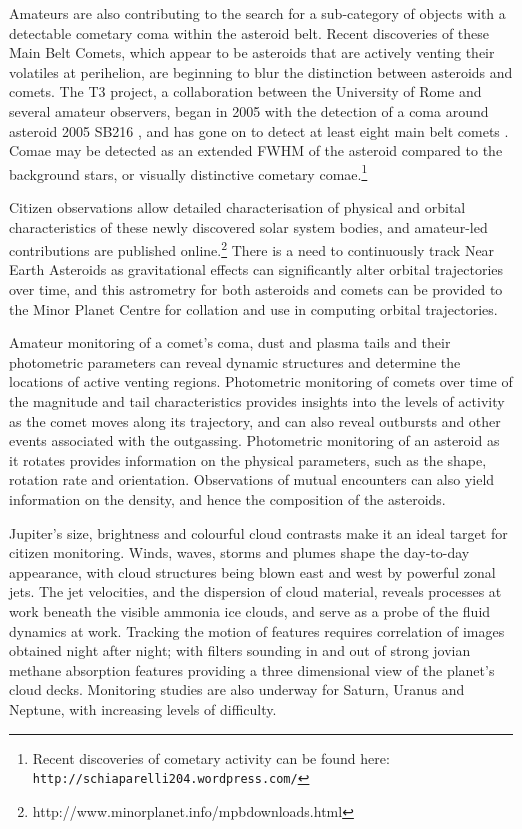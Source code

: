 \documentclass{ar2e}
\begin{document}
Amateurs are also contributing to the search for a sub-category of objects
with a detectable cometary coma within the asteroid belt.  Recent discoveries
of these Main Belt Comets, which appear to be asteroids that are actively
venting their volatiles at perihelion, are beginning to blur the distinction
between asteroids and comets.  The T3 project, a collaboration between the
University of Rome and several amateur observers, began in 2005 with the
detection of a coma around asteroid 2005 SB216 \citep{05buzzi}, and has gone
on to detect at least eight main belt comets \citep{13mousis}. Comae may be
detected as an extended FWHM of the asteroid compared to the background stars,
or visually distinctive cometary comae.\footnote{Recent discoveries of cometary
activity can be found here: \texttt{http://schiaparelli204.wordpress.com/}}

Citizen observations allow detailed characterisation of physical and orbital
characteristics of these newly discovered solar system bodies, and amateur-led
contributions are published
online.\footnote{http://www.minorplanet.info/mpbdownloads.html}  There is a need
to continuously track Near Earth Asteroids as gravitational effects can
significantly alter orbital trajectories over time, and this astrometry for both
asteroids and comets can be provided to the Minor Planet Centre for collation
and use in computing orbital trajectories.  

Amateur monitoring of a comet's coma, dust and plasma tails and their
photometric parameters can reveal dynamic structures and determine the locations
of active venting regions.  Photometric monitoring of comets over time of the
magnitude and tail characteristics provides insights into the levels of activity
as the comet moves along its trajectory, and can also reveal outbursts and other
events associated with the outgassing.  Photometric monitoring of an asteroid as
it rotates provides information on the physical parameters, such as the shape,
rotation rate and orientation.  Observations of mutual encounters can also yield
information on the density, and hence the composition of the asteroids.



Jupiter's size, brightness and colourful cloud contrasts make it an ideal target
for citizen monitoring.  Winds, waves, storms and plumes shape the day-to-day
appearance, with cloud structures being blown east and west by powerful zonal
jets.  The jet velocities, and the dispersion of cloud material, reveals
processes at work beneath the visible ammonia ice clouds, and serve as a probe
of the fluid dynamics at work.  Tracking the motion of features requires
correlation of images obtained night after night; with filters sounding in and
out of strong jovian methane absorption features providing a three dimensional
view of the planet's cloud decks.  Monitoring studies are also underway for
Saturn, Uranus and Neptune, with increasing levels of difficulty. 
\end{document}
